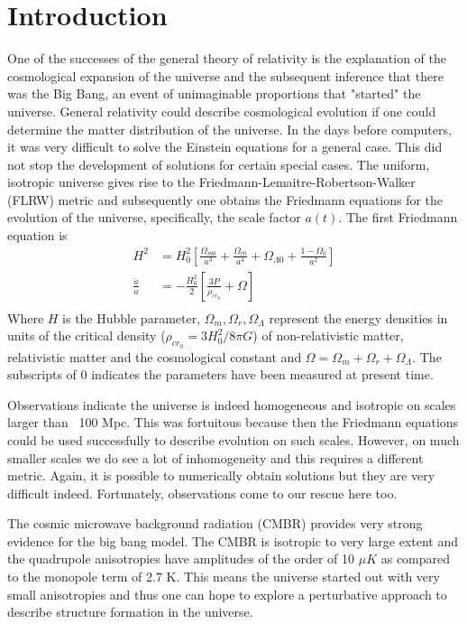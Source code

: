 \documentclass[12pt,a4paper,oneside]{book}
\begin{document}
	\section{Introduction}
		One of the successes of the general theory of relativity is the explanation of the cosmological expansion of the universe and the subsequent inference that there was the Big Bang, an event of unimaginable proportions that "started" the universe. General relativity could describe cosmological evolution if one could determine the matter distribution of the universe. In the days before computers, it was very difficult to solve the Einstein equations for a general case. This did not stop the development of solutions for certain special cases. The uniform, isotropic universe gives rise to the Friedmann-Lemaitre-Robertson-Walker (FLRW) metric and subsequently one obtains the Friedmann equations for the evolution of the universe, specifically, the scale factor $a(t)$. The first Friedmann equation is
		\begin{equation}
			\begin{aligned}
				H^2&=H_0^2\left[\frac{\Omega_{m0}}{a^3}+
													\frac{{\Omega}_{r0}}{a^4}+
													{\Omega}_{\Lambda 0}+
													\frac{1-\Omega_0}{a^2}\right]\\
				\frac{\ddot{a}}{a}&=-\frac{H_0^2}{2}[\frac{3P}{\rho_{cr_0}}+\Omega]\\
			\end{aligned}
		\end{equation}
		Where $H$ is the Hubble parameter, $\Omega_{m},\Omega_{r},\Omega_{\Lambda}$ represent the energy densities in units of the critical density ($\rho_{cr_0}=3H_0^2/8\pi G$) of non-relativistic matter, relativistic matter and the cosmological constant and $\Omega=\Omega_{m}+\Omega_{r}+\Omega_{\Lambda }$. The subscripts of 0 indicates the parameters have been measured at present time.
		
		Observations indicate the universe is indeed homogeneous and isotropic on scales larger than ~100 Mpc. This was fortuitous because then the Friedmann equations could be used successfully to describe evolution on such scales. However, on much smaller scales we do see a lot of inhomogeneity and this requires a different metric. Again, it is possible to numerically obtain solutions but they are very difficult indeed. Fortunately, observations come to our rescue here too.
		
		The cosmic microwave background radiation (CMBR) provides very strong evidence for the big bang model. The CMBR is isotropic to very large extent and the quadrupole anisotropies have amplitudes of the order of 10 $\mu K$ as compared to the monopole term of 2.7 K. This means the universe started out with very small anisotropies and thus one can hope to explore a perturbative approach to describe structure formation in the universe.
		
\end{document}
